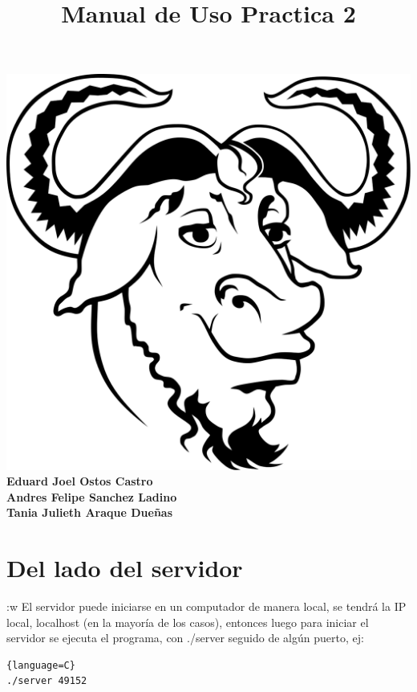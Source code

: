 \documentclass {article}
\begin{document}
\title{Manual de Uso Practica 2}
\maketitle
\begin{center}
  \includegraphics[scale=0.2]{gnu}\\
  \vspace{3cm}
  \textbf{Eduard Joel Ostos Castro}\\
  \textbf{Andres Felipe Sanchez Ladino}\\ 
  \textbf{Tania Julieth Araque Dueñas}\\ 
\end{center}

\newpage
{}

\section{Del lado del servidor}:w
El servidor puede iniciarse en un computador de manera local, se tendrá la IP local, localhost (en la mayoría de los casos), entonces luego para iniciar el servidor se ejecuta el programa, con ./server seguido de algún puerto, ej:
\begin{lstlisting}{language=C}
./server 49152
\end{lstlisting}
\end{document}
